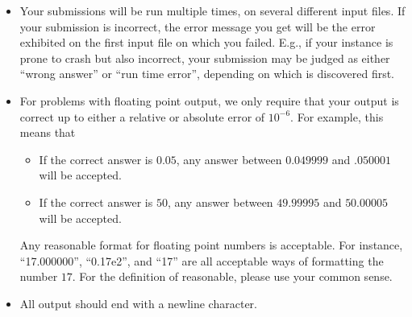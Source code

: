 \begin{itemize}

\item

 Your submissions will be run multiple times, on several different
 input files.  If your submission is incorrect, the error message you
 get will be the error exhibited on the first input file on which you
 failed.  E.g., if your instance is prone to crash but also incorrect,
 your submission may be judged as either ``wrong answer'' or ``run
 time error'', depending on which is discovered first.

\item 

 For problems with floating point output, we only require
 that your output is correct up to either a relative or absolute error
 of $10^{-6}$.  For example, this means that
 \begin{itemize}
 \item If the correct answer is $0.05$, any answer between $0.049999$ and $.050001$ will be accepted.
 \item If the correct answer is $50$, any answer between $49.99995$ and $50.00005$ will be accepted.
 \end{itemize}
 Any reasonable format for floating point numbers is
 acceptable.  For instance, ``17.000000'', ``0.17e2'', and
 ``17'' are all acceptable ways of formatting the number $17$.  For
 the definition of reasonable, please use your common sense.

\item

All output should end with a newline character. 

\end{itemize}

\cleardoublepage


\setcounter{page}{1}
\pagestyle{myheadings}



